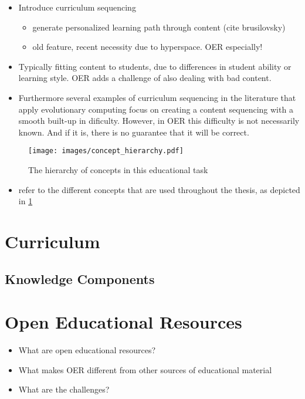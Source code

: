 \label{ch_problem_domain}
\begin{itemize}
	\item Introduce curriculum sequencing
		\begin{itemize}
			\item generate personalized learning path through content (cite
				brusilovsky)
			\item old feature, recent necessity due to hyperspace. OER
				especially!
		\end{itemize}
	\item Typically fitting content to students, due to differences in student
		ability or learning style. OER adds a challenge of also dealing with
		bad content.
	\item Furthermore several examples of curriculum sequencing in the
		literature that apply evolutionary computing focus on creating a
		content sequencing with a smooth built-up in dificulty. However, in OER
		this difficulty is not necessarily known. And if it is, there is no
		guarantee that it will be correct.
\end{itemize}
\begin{figure}[ht!]
	\centering
	\texttt{[image: images/concept\_hierarchy.pdf]}
	\caption[Concept hierarchy]{The hierarchy of concepts in this educational
	task}
	\label{fig:concept_hierarchy}
\end{figure}
\begin{itemize}
	\item refer to the different concepts that are used throughout the thesis,
		as depicted in \ref{fig:concept_hierarchy}
\end{itemize}
\section{Curriculum}
\subsection{Knowledge Components}
\section{Open Educational Resources}
\begin{itemize}
	\item What are open educational resources?
	\item What makes OER different from other sources of educational material
	\item What are the challenges?
\end{itemize}
